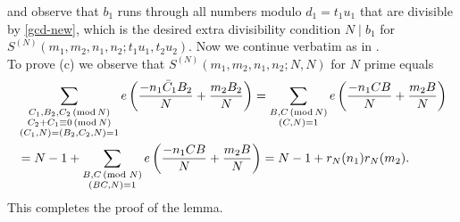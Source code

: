 \documentclass[11pt]{amsart}
\theoremstyle{plain}
\newtheorem{lemma}{Lemma}
\numberwithin{equation}{section}
\theoremstyle{definition}
\begin{document}
and observe that $b_1$ runs through all numbers modulo $d_1 = t_1u_1$ that are divisible by \eqref{gcd-new}, which is the desired extra divisibility condition $N \mid b_1$ for  $S^{ (N)}(m_1, m_2, n_1, n_2; t_1u_1, t_2u_2) $.  Now we continue verbatim as in \cite{BFG}.\\
 To prove (c) we observe that   $S^{(N)}(m_1, m_2, n_1, n_2; N, N) $  for $N$ prime equals
 \begin{displaymath}
\begin{split}
 &   \sum_{\substack{C_1, B_2, C_2 \, ({\rm mod }\,  N)\\  C_2   +  C_1 \equiv 0 \, ({\rm mod }\,  N)\\ (  C_1, N) = (B_2, C_2, N)   = 1 }} e\left(\frac{  -n_1 \bar{C}_1 B_2}{N} + \frac{m_2B_2  }{N}\right)=   \sum_{\substack{B, C \, ({\rm mod }\, N)\\ (C, N) = 1}} e\left(\frac{  -n_1 C  B}{N} + \frac{m_2B }{N}\right)\\
 & =  N-1 + \sum_{\substack{B, C\, (\text{mod } N)\\ (BC, N) = 1}} e\left(\frac{  -n_1 C  B}{N} + \frac{m_2B }{N}\right)  = N-1 + r_N(n_1) r_N(m_2).    \end{split}
\end{displaymath}
This completes the proof of the lemma. \\%

\end{document}
